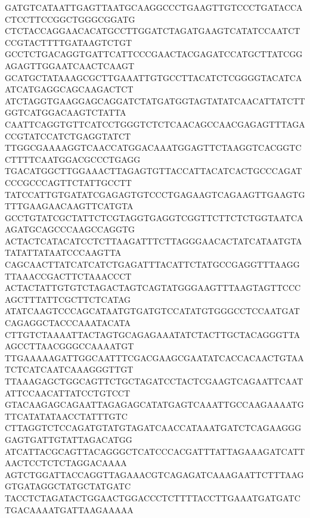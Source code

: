 GATGTCATAATTGAGTTAATGCAAGGCCCTGAAGTTGTCCCTGATACCACTCCTTCCGGCTGGGCGGATG
CTCTACCAGGAACACATGCCTTGGATCTAGATGAAGTCATATCCAATCTCCGTACTTTTGATAAGTCTGT
GCCTCTGACAGGTGATTCATTCCCGAACTACGAGATCCATGCTTATCGGAGAGTTGGAATCAACTCAAGT
GCATGCTATAAAGCGCTTGAAATTGTGCCTTACATCTCGGGGTACATCAATCATGAGGCAGCAAGACTCT
ATCTAGGTGAAGGAGCAGGATCTATGATGGTAGTATATCAACATTATCTTGGTCATGGACAAGTCTATTA
CAATTCAGGTGTTCATCCTGGGTCTCTCAACAGCCAACGAGAGTTTAGACCGTATCCATCTGAGGTATCT
TTGGCGAAAAGGTCAACCATGGACAAATGGAGTTCTAAGGTCACGGTCCTTTTCAATGGACGCCCTGAGG
TGACATGGCTTGGAAACTTAGAGTGTTACCATTACATCACTGCCCAGATCCCGCCCAGTTCTATTGCCTT
TATCCATTGTGATATCGAGAGTGTCCCTGAGAAGTCAGAAGTTGAAGTGTTTGAAGAACAAGTTCATGTA
GCCTGTATCGCTATTCTCGTAGGTGAGGTCGGTTCTTCTCTGGTAATCAAGATGCAGCCCAAGCCAGGTG
ACTACTCATACATCCTCTTAAGATTTCTTAGGGAACACTATCATAATGTATATATTATAATCCCAAGTTA
CAGCAACTTATCATCATCTGAGATTTACATTCTATGCCGAGGTTTAAGGTTAAACCGACTTCTAAACCCT
ACTACTATTGTGTCTAGACTAGTCAGTATGGGAAGTTTAAGTAGTTCCCAGCTTTATTCGCTTCTCATAG
ATATCAAGTCCCAGCATAATGTGATGTCCATATGTGGGCCTCCAATGATCAGAGGCTACCCAAATACATA
CTTGTCTAAAATTACTAGTGCAGAGAAATATCTACTTGCTACAGGGTTAAGCCTTAACGGGCCAAAATGT
TTGAAAAAGATTGGCAATTTCGACGAAGCGAATATCACCACAACTGTAATCTCATCAATCAAAGGGTTGT
TTAAAGAGCTGGCAGTTCTGCTAGATCCTACTCGAAGTCAGAATTCAATATTCCAACATTATCCTGTCCT
GTACAAGAGCAGAATTAGAGAGCATATGAGTCAAATTGCCAAGAAAATGTTCATATATAACCTATTTGTC
CTTAGGTCTCCAGATGTATGTAGATCAACCATAAATGATCTCAGAAGGGGAGTGATTGTATTAGACATGG
ATCATTACGCAGTTACAGGGCTCATCCCACGATTTATTAGAAAGATCATTAACTCCTCTCTAGGACAAAA
AGTCTGGATTACCAGGTTAGAAACGTCAGAGATCAAAGAATTCTTTAAGGTGATAGGCTATGCTATGATC
TACCTCTAGATACTGGAACTGGACCCTCTTTTACCTTGAAATGATGATCTGACAAAATGATTAAGAAAAA



